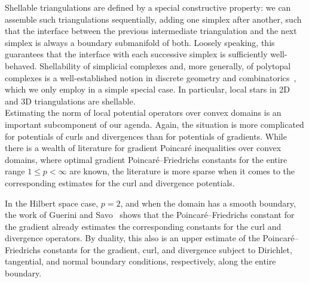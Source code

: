 \documentclass[10pt,letterpaper]{article}
\begin{document}
Shellable triangulations are defined by a special constructive property:
we can assemble such triangulations sequentially, adding one simplex after another, such that the interface between the previous intermediate triangulation and the next simplex is always a boundary submanifold of both.
Loosely speaking, this guarantees that the interface with each successive simplex is sufficiently well-behaved.
Shellability of simplicial complexes and, more generally, of polytopal complexes is a well-established notion in discrete geometry and combinatorics~\cite{ziegler1995lectures}, which we only employ in a simple special case. 
In particular, local stars in 2D and 3D triangulations are shellable. 
\\



Estimating the norm of local potential operators over convex domains is an important subcomponent of our agenda. 
Again, the situation is more complicated for potentials of curls and divergences than for potentials of gradients.
While there is a wealth of literature for gradient Poincar\'e inequalities over convex domains, where optimal gradient Poincar\'e--Friedrichs constants for the entire range $1 \leq p < \infty$ are known,
the literature is more sparse when it comes to the corresponding estimates for the curl and divergence potentials.

In the Hilbert space case, $p=2$, and when the domain has a smooth boundary, the work of Guerini and Savo~\cite{guerini2004eigenvalue} shows that the Poincar\'e--Friedrichs constant for the gradient already estimates the corresponding constants for the curl and divergence operators. By duality, this also is an upper estimate of the Poincar\'e--Friedrichs constants for the gradient, curl, and divergence subject to Dirichlet, tangential, and normal boundary conditions, respectively, along the entire boundary. 
\end{document}

